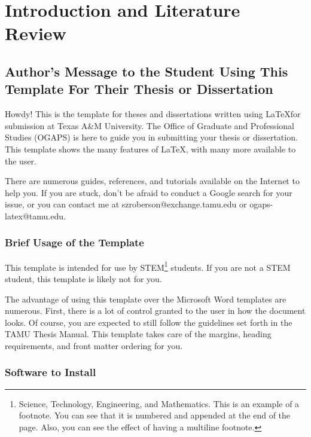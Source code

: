 

\chapter{Introduction and Literature Review}

\section{Author's Message to the Student Using This Template For Their Thesis or Dissertation}

Howdy! This is the template for theses and dissertations written using \LaTeX for submission at Texas A\&M University. The Office of Graduate and Professional Studies (OGAPS) is here to guide you in submitting your thesis or dissertation. This template shows the many features of \LaTeX, with many more available to the user.

There are numerous guides, references, and tutorials available on the Internet to help you. If you are stuck, don't be afraid to conduct a Google search for your issue, or you can contact me at szroberson@exchange.tamu.edu or ogaps-latex@tamu.edu.


\subsection{Brief Usage of the Template}

This template is intended for use by STEM\footnote{Science, Technology, Engineering, and Mathematics. This is an example of a footnote. You can see that it is numbered and appended at the end of the page. Also, you can see the effect of having a multiline footnote.} students. If you are not a STEM student, this template is likely not for you.

The advantage of using this template over the Microsoft Word templates are numerous. First, there is a lot of control granted to the user in how the document looks. Of course, you are expected to still follow the guidelines set forth in the TAMU Thesis Manual. This template takes care of the margins, heading requirements, and front matter ordering for you.


\subsection*{Software to Install}

